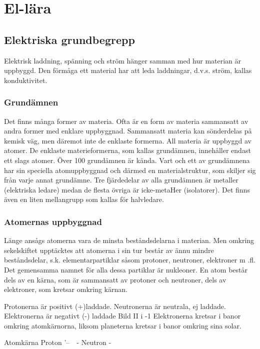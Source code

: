 \chapter{El-lära}

\section{Elektriska grundbegrepp}

Elektrisk laddning, spänning och ström hänger samman med hur materian är uppbyggd.
Den förmåga ett material har att leda laddningar, d.v.s. ström, kallas konduktivitet.

\subsection{Grundämnen}

Det finns många former av materia. Ofta är en form av materia sammansatt av andra
former med enklare uppbyggnad.
Sammansatt materia kan sönderdelas på kemisk väg, men
däremot inte de enklaste formerna. All materia är uppbyggd av atomer. De enklaste
materieformerna, som kallas grundämnen, innehåller endast ett slags atomer. Över
100 grundämnen är kända.
Vart och ett av grundämnena har sin speciella atomuppbyggnad och därmed en
materialstruktur, som skiljer sig från varje annat grundämne.
Tre fjärdedelar av alla grundämnen är metaller (elektriska ledare) medan de flesta
övriga är icke-metaHer (isolatorer). Det finns även en liten mellangrupp som kallas för
halvledare.

\subsection{Atomernas uppbyggnad}

Länge ansågs atomerna vara de minsta
beståndsdelarna i materian. Men omkring
sekelskiftet upptäcktes att atomerna i sin tur
består av ännu mindre beståndsdelar, s.k.
elementarpartiklar såsom protoner, neutroner, elektroner m .fl. Det gemensamma namnet för alla dessa partiklar är nukleoner.
En atom består dels av en kärna, som är
sammansatt av protoner och neutroner, dels
av elektroner, som kretsar omkring kärnan.

Protonerna är positivt (+)laddade.
Neutronerna är neutrala, ej laddade.
Elektronerna är negativt (-) laddade
Bild II i -1 Elektronerna kretsar i banor
omkring atomkärnorna, liksom planeterna
kretsar i banor omkring sina solar.

Atomkärna
Proton
'--\-~~- Neutron
-

